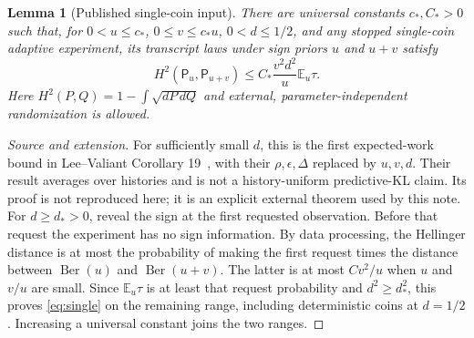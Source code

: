 \documentclass[11pt]{article}
\newtheorem{lemma}[theorem]{Lemma}
\theoremstyle{definition}\newtheorem{conjecture}[theorem]{Conjecture}
\theoremstyle{remark}\newtheorem{remark}[theorem]{Remark}
\newcommand{\E}{\mathbb E}\newcommand{\PP}{\mathbb P}\newcommand{\R}{\mathbb R}
\begin{document}
\begin{lemma}[Published single-coin input]\label{lem:LV}
There are universal constants $c_*,C_*>0$ such that, for $0<u\le c_*$, $0\le v\le c_*u$, $0<d\le1/2$, and any stopped single-coin adaptive experiment, its transcript laws under sign priors $u$ and $u+v$ satisfy
\begin{equation}\label{eq:single}
 H^2(\mathsf P_u,\mathsf P_{u+v})\le
 C_*\frac{v^2d^2}{u}\E_u\tau.
\end{equation}
Here $H^2(P,Q)=1-\int\sqrt{dP\,dQ}$ and external, parameter-independent randomization is allowed.
\end{lemma}
\begin{proof}[Source and extension]
For sufficiently small $d$, this is the first expected-work bound in Lee--Valiant Corollary 19~\cite{lv}, with their $\rho,\epsilon,\Delta$ replaced by $u,v,d$. Their result averages over histories and is not a history-uniform predictive-KL claim. Its proof is not reproduced here; it is an explicit external theorem used by this note.
For $d\ge d_*>0$, reveal the sign at the first requested observation. Before that request the experiment has no sign information. By data processing, the Hellinger distance is at most the probability of making the first request times the distance between $\operatorname{Ber}(u)$ and $\operatorname{Ber}(u+v)$. The latter is at most $C v^2/u$ when $u$ and $v/u$ are small. Since $\E_u\tau$ is at least that request probability and $d^2\ge d_*^2$, this proves \eqref{eq:single} on the remaining range, including deterministic coins at $d=1/2$. Increasing a universal constant joins the two ranges.
\end{proof}
\end{document}
